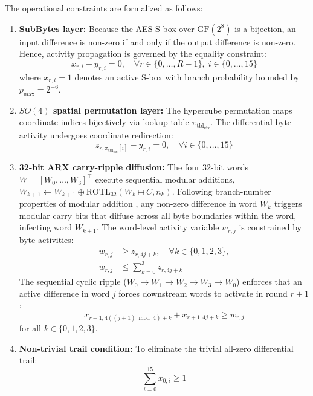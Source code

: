 \documentclass[review,12pt]{elsarticle}
\begin{document}
The operational constraints are formalized as follows:
\begin{enumerate}
    \item \textbf{SubBytes layer:} Because the AES S-box over $\text{GF}(2^8)$ is a bijection, an input difference is non-zero if and only if the output difference is non-zero. Hence, activity propagation is governed by the equality constraint:
    \begin{equation}
        x_{r, i} - y_{r, i} = 0, \quad \forall r \in \{0, \dots, R-1\}, \; i \in \{0, \dots, 15\}
    \end{equation}
    where $x_{r, i} = 1$ denotes an active S-box with branch probability bounded by $p_{\max} = 2^{-6}$.
    
    \item \textbf{$SO(4)$ spatial permutation layer:} The hypercube permutation maps coordinate indices bijectively via lookup table $\pi_{\text{tbl}_{\text{idx}}}$. The differential byte activity undergoes coordinate redirection:
    \begin{equation}
        z_{r, \pi_{\text{tbl}_{\text{idx}}}[i]} - y_{r, i} = 0, \quad \forall i \in \{0, \dots, 15\}
    \end{equation}
    
    \item \textbf{32-bit ARX carry-ripple diffusion:} The four 32-bit words $W = [W_0, \dots, W_3]^\top$ execute sequential modular additions, $W_{k+1} \leftarrow W_{k+1} \oplus \text{ROTL}_{32}(W_k \boxplus C, n_k)$. Following branch-number properties of modular addition \cite{mouha2011differential, hadipour2023impossible}, any non-zero difference in word $W_k$ triggers modular carry bits that diffuse across all byte boundaries within the word, infecting word $W_{k+1}$. The word-level activity variable $w_{r, j}$ is constrained by byte activities:
    \begin{equation}
    \begin{aligned}
        w_{r, j} &\ge z_{r, 4j + k}, \quad \forall k \in \{0, 1, 2, 3\}, \\
        w_{r, j} &\le \sum_{k=0}^3 z_{r, 4j + k}
    \end{aligned}
    \end{equation}
    The sequential cyclic ripple ($W_0 \to W_1 \to W_2 \to W_3 \to W_0$) enforces that an active difference in word $j$ forces downstream words to activate in round $r+1$:
    \begin{equation}
        x_{r+1, 4((j+1)\bmod 4) + k} + x_{r+1, 4j + k} \ge w_{r, j}
    \end{equation}
    for all $k \in \{0, 1, 2, 3\}$.
    
    \item \textbf{Non-trivial trail condition:} To eliminate the trivial all-zero differential trail:
    \begin{equation}
        \sum_{i=0}^{15} x_{0, i} \ge 1
    \end{equation}
\end{enumerate}
\end{document}
